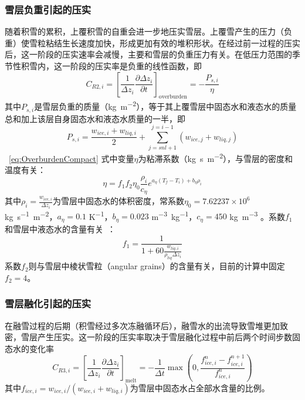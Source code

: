 \subsubsection{雪层负重引起的压实}
随着积雪的累积，上覆积雪的自重会进一步地压实雪层。上覆雪产生的压力（负重）使雪粒粘结生长速度加快，形成更加有效的堆积形状。在经过前一过程的压实后，这一阶段的压实速率会减慢，主要和雪层的负重压力有关。在低压力范围的季节性积雪内，这一阶段的压实率是负重的线性函数\citep{anderson1976point}，即
\begin{equation}\label{eq:OverburdenCompact}
C_{R2,i}=\left[\frac{1}{\Delta {z_i}} \frac{\partial \Delta {z_i}}{\partial {t}}\right]_{\text {overburden}}=-\frac{P_{s,i}}{\eta}
\end{equation}
其中$P_{s,i}$是雪层负重的质量（\unit{kg.m^{-2}}），等于其上覆雪层中固态水和液态水的质量总和加上该层自身固态水和液态水质量的一半，即
\begin{equation}
P_{s,i}=\frac{w_{ice,i}+w_{liq,i}}{2}+\sum_{{j}={snl}+1}^{{j}={i}-1}\left({w}_{ice,j}+{w}_{liq,j}\right)
\end{equation}
~\eqref{eq:OverburdenCompact} 式中变量$\eta$为粘滞系数（\unit{kg.s.m^{-2}}），与雪层的密度和温度有关：
\begin{equation}
    \eta=f_1 f_2 \eta_0 \frac{\rho_i}{c_\eta} e^{a_\eta \left(T_f-T_i\right)+b_\eta \rho_i}
\end{equation}
其中$\rho_i=\frac{w_{ice,i}}{\Delta z_i}$为雪层中固态水的体积密度，常系数$\eta_0=7.62237 \times 10^6$ \unit{kg.s^{-1}.m^{-2}}，$a_\eta=0.1$ \unit{K^{-1}}，$b_\eta=0.023$ \unit{m^{-3}.kg^{-1}}，$c_\eta=450$ \unit{kg.m^{-3}} \citep{Kampenhout2017}。系数$f_1$和雪层中液态水的含量有关~\citep{Vionnet2012}：
\begin{equation}
    f_1=\frac{1}{1+60\frac{w_{liq,i}}{\rho_{liq}\Delta z_i}}
\end{equation}
系数$f_2$则与雪层中棱状雪粒（angular grains）的含量有关，目前的计算中固定$f_2=4$。

\subsubsection{雪层融化引起的压实}
在融雪过程的后期（积雪经过多次冻融循环后），融雪水的出流导致雪堆更加致密，雪层产生压实。这一阶段的压实率取决于雪层融化过程中前后两个时间步数固态水的变化率
\begin{equation}
C_{R3,i}=\left[\frac{1}{\Delta {z_i}} \frac{\partial \Delta {z_i}}{\partial {t}}\right]_{\text{melt}}=-\frac{1}{\Delta {t}}\max\left(0,\frac{{f}_{{ice,i}}^{n}-{f}_{{ice,i}}^{n+1}}{{f}_{ice,i}^{n}}\right)
\end{equation}
其中$f_{ice,i}=w_{ice,i}/\left({w_{ice,i}+w_{liq,i}}\right)$为雪层中固态水占全部水含量的比例。

